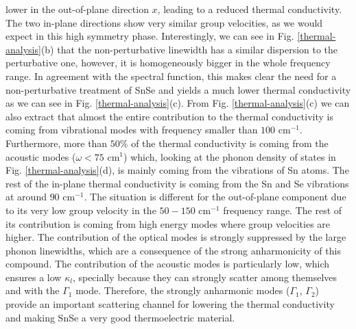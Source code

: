lower in the out-of-plane direction $x$, leading to a reduced thermal conductivity. The two in-plane directions show 
very similar group velocities, as we would expect in this high symmetry phase. Interestingly, we can see in 
Fig. \ref{thermal-analysis}(b) that the non-perturbative linewidth has a similar dispersion to the perturbative one, 
however, it is homogeneously bigger in the whole frequency range. In agreement with the spectral function, this 
makes clear the need for a non-perturbative treatment of SnSe and yields a much lower thermal conductivity as we can 
see in Fig. \ref{thermal-analysis}(c). From Fig. \ref{thermal-analysis}(c) we can also extract that almost the entire 
contribution to the thermal conductivity is coming from vibrational modes with frequency smaller than $100$ cm$^{-1}$. Furthermore, more than $50\%$ of the thermal conductivity is coming from the acoustic modes
($\omega<75$ cm$^{1}$) which, looking at the phonon density of states in Fig. \ref{thermal-analysis}(d), is mainly 
coming from the vibrations of Sn atoms. The rest of the in-plane thermal conductivity is coming from the Sn and Se 
vibrations at around $90$ cm$^{-1}$. The situation is different for the out-of-plane component due to its very low 
group velocity in the $50-150$ cm$^{-1}$ frequency range. The rest of its contribution is coming from high energy 
modes where group velocities are higher. The contribution of the optical modes is strongly suppressed by the large 
phonon linewidths, which are a consequence of the strong anharmonicity of this compound. The contribution of the 
acoustic modes is particularly low, which ensures a low $\kappa_l$, specially because they can strongly scatter 
among themselves and with the $\Gamma_1$ mode. Therefore, the strongly anharmonic modes ($\Gamma_{1}$, $\Gamma_{2}$) 
provide an important scattering channel for lowering the thermal conductivity and making SnSe a very good 
thermoelectric material. 

